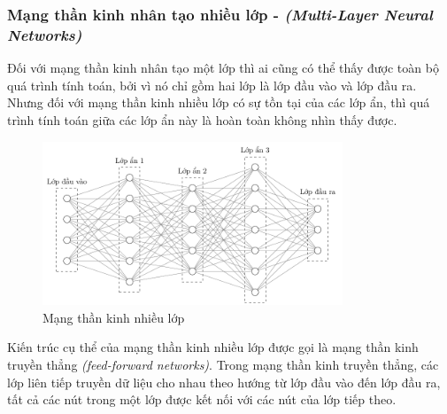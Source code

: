 \subsubsection{Mạng thần kinh nhân tạo nhiều lớp - \textit{(Multi-Layer Neural Networks)}}
Đối với mạng thần kinh nhân tạo một lớp thì ai cũng có thể thấy được toàn bộ quá trình tính toán, bởi vì nó chỉ gồm hai lớp là lớp đầu vào và lớp đầu ra. Nhưng đối với mạng thần kinh nhiều lớp có sự tồn tại của các lớp ẩn, thì quá trình tính toán giữa các lớp ẩn này là hoàn toàn không nhìn thấy được.
\begin{figure}[htbp]
    \centering
    \includegraphics[width=0.8\textwidth]{tikz_image/multi_layer_neural_network.pdf}
    \caption{Mạng thần kinh nhiều lớp}
    \label{figure:multi-layer-nn}
\end{figure}

Kiến trúc cụ thể của mạng thần kinh nhiều lớp được gọi là mạng thần kinh truyền thẳng \textit{(feed-forward networks)}. Trong mạng thần kinh truyền thẳng, các lớp liên tiếp truyền dữ liệu cho nhau theo hướng từ lớp đầu vào đến lớp đầu ra, tất cả các nút trong một lớp được kết nối với các nút của lớp tiếp theo.


